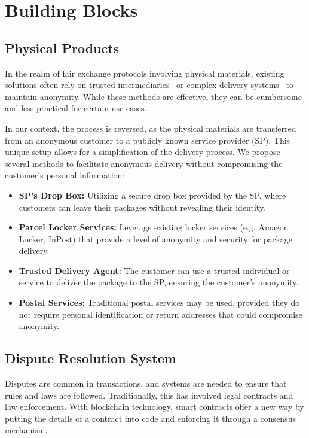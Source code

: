 \documentclass[pdftex,twocolumn,epjc3]{svjour3}
\begin{document}
\section{Building Blocks}\label{sec:building-blocks}

\subsection{Physical Products}\label{sec:physical-products}
In the realm of fair exchange protocols involving physical materials, existing solutions often rely on trusted intermediaries~\cite{mohammedalarajFairnessPhysicalProducts2012, birjoveanuAnonymityFairexchangeEcommerce2015} or complex delivery systems~\cite{altawyLelantosBlockchainBasedAnonymous2017} to maintain anonymity. While these methods are effective, they can be cumbersome and less practical for certain use cases.

In our context, the process is reversed, as the physical materials are transferred from an anonymous customer to a publicly known service provider (SP). This unique setup allows for a simplification of the delivery process. We propose several methods to facilitate anonymous delivery without compromising the customer's personal information:

\begin{itemize}
    \item \textbf{SP's Drop Box:} Utilizing a secure drop box provided by the SP, where customers can leave their packages without revealing their identity.
    
    \item \textbf{Parcel Locker Services:} Leverage existing locker services (e.g. Amazon Locker, InPost) that provide a level of anonymity and security for package delivery.
    
    \item \textbf{Trusted Delivery Agent:} The customer can use a trusted individual or service to deliver the package to the SP, ensuring the customer's anonymity.
    
    \item \textbf{Postal Services:} Traditional postal services may be used, provided they do not require personal identification or return addresses that could compromise anonymity.
\end{itemize}



\subsection{Dispute Resolution System}
\label{sec:dispute-resolution}
\begin{sloppypar}
Disputes are common in transactions, and systems are needed to ensure that rules and laws are followed. Traditionally, this has involved legal contracts and law enforcement. With blockchain technology, smart contracts offer a new way by putting the details of a contract into code and enforcing it through a consensus mechanism.~\cite{allenGovernanceBlockchainDispute2019,lingwallShouldCodeBe2019}.
\end{sloppypar}
\end{document}
